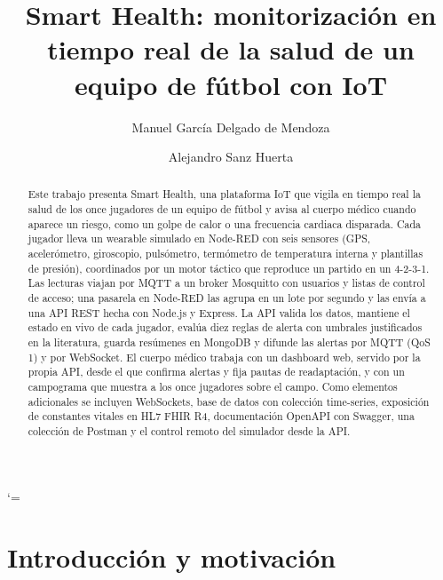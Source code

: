 \documentclass[runningheads]{llncs}
\begin{document}
\catcode`\/=\active
\sloppy
\setlength{\emergencystretch}{3em}
%
\title{Smart Health: monitorización en tiempo real de la salud de un equipo de fútbol con IoT}
%
%
\author{Manuel García Delgado de Mendoza \and Alejandro Sanz Huerta}
%
%
%
\maketitle
%
\begin{abstract}
Este trabajo presenta Smart Health, una plataforma IoT que vigila en tiempo real la salud de los once jugadores de un equipo de fútbol y avisa al cuerpo médico cuando aparece un riesgo, como un golpe de calor o una frecuencia cardiaca disparada. Cada jugador lleva un wearable simulado en Node-RED con seis sensores (GPS, acelerómetro, giroscopio, pulsómetro, termómetro de temperatura interna y plantillas de presión), coordinados por un motor táctico que reproduce un partido en un 4-2-3-1. Las lecturas viajan por MQTT a un broker Mosquitto con usuarios y listas de control de acceso; una pasarela en Node-RED las agrupa en un lote por segundo y las envía a una API REST hecha con Node.js y Express. La API valida los datos, mantiene el estado en vivo de cada jugador, evalúa diez reglas de alerta con umbrales justificados en la literatura, guarda resúmenes en MongoDB y difunde las alertas por MQTT (QoS 1) y por WebSocket. El cuerpo médico trabaja con un dashboard web, servido por la propia API, desde el que confirma alertas y fija pautas de readaptación, y con un campograma que muestra a los once jugadores sobre el campo. Como elementos adicionales se incluyen WebSockets, base de datos con colección time-series, exposición de constantes vitales en HL7 FHIR R4, documentación OpenAPI con Swagger, una colección de Postman y el control remoto del simulador desde la API.

\end{abstract}

\section{Introducción y motivación}
\end{document}
